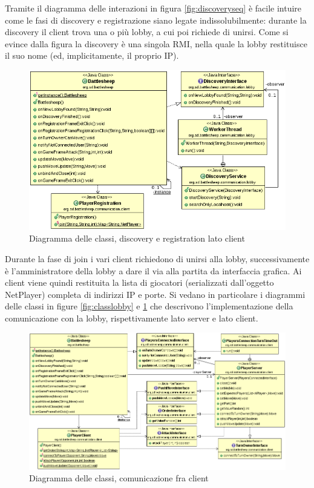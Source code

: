 Tramite il diagramma delle interazioni in figura \ref{fig:discoveryseq} 
è facile intuire come le fasi di discovery e registrazione siano legate 
indissolubilmente: durante la discovery il client trova una o più lobby, a cui 
poi richiede di unirsi. Come si evince dalla figura la discovery è una singola 
RMI, nella quale la lobby restituisce il suo nome (ed, implicitamente, il 
proprio IP). 

\begin{figure}[!ht]
    \centering
    \includegraphics[scale=0.70,center]{core/imgs/UML/RegistrationBattlesheepCommunicationUML-noattr.png}
    \caption{Diagramma delle classi, discovery e registration lato client}
    \label{fig:classregistration}
\end{figure}

Durante la fase di join i vari client richiedono di unirsi alla 
lobby, successivamente è l'amministratore della lobby a dare il via alla 
partita da interfaccia grafica. Ai client viene quindi restituita la lista di 
giocatori (serializzati dall'oggetto NetPlayer) completa di indirizzi IP e 
porte. Si vedano in particolare i diagrammi delle classi in figure \ref{fig:classlobby}
e \ref{fig:classregistration} che descrivono l'implementazione della comunicazione con la lobby,
rispettivamente lato server e lato client.

\begin{figure}[!ht]
    \centering
    \includegraphics[scale=0.50,center]{core/imgs/UML/GameBattlesheepCommunicationUML-noattr.png}
    \caption{Diagramma delle classi, comunicazione fra client}
    \label{fig:classgame}
\end{figure}

